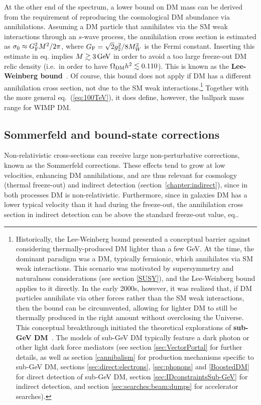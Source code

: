 At the other end of the spectrum, a lower bound on DM mass can be derived from the requirement of reproducing the cosmological DM abundance via annihilations. 
Assuming a DM particle that annihilates via the SM weak interactions through an $s$-wave process, 
the annihilation cross section is estimated as $\sigma_0 \approx G_{\rm F}^2 M^2/2\pi$, where $G_{\rm F} = \sqrt{2}g_2^2/8M^2_W$ is the Fermi constant. Inserting this estimate in eq. implies 
$M \gtrsim 3 \,{\rm GeV}$ in order to avoid a too large freeze-out DM relic density (i.e.~in order to have $\Omega_{\rm DM}h^2 \lesssim 0.110$). 
This is known as the {\bf Lee-Weinberg bound}~\cite{LeeWeinberg}. 
Of course, this bound does not apply if DM has a different annihilation cross section,
not due to the SM weak interactions.\footnote{
Historically, the Lee-Weinberg bound presented a conceptual barrier against considering thermally-produced DM lighter than a few GeV. 
At the time, the dominant paradigm was a DM, typically fermionic, which annihilates via SM weak interactions. This scenario was  
motivated by supersymmetry and naturalness considerations (see section \ref{SUSY}), and the Lee-Weinberg bound  applies to it directly.
 In the early 2000s, however,  it was realized that, if DM particles annihilate via other forces rather than the SM weak interactions, then the bound can be circumvented, allowing for lighter DM to still be thermally produced in the right amount without overclosing the Universe. 
This conceptual breakthrough initiated the theoretical explorations of {\bf sub-GeV DM}~\cite{sub-GeVDM}.  The models of sub-GeV DM typically feature a dark photon or other light dark force mediators (see section \ref{sec:VectorPortal} for further details, as well as section \ref{cannibalism} for production mechanisms specific to sub-GeV DM, 
sections \ref{sec:direct:electrons}, \ref{sec:phonons} and \ref{BoostedDM} for direct detection of sub-GeV DM, section \ref{sec:IDconstraintsSub-GeV} for indirect detection, and section \ref{sec:searches:beam:dumps} for accelerator searches).}
Together with the more general eq.~(\ref{eq:100TeV}), it does define, however, the ballpark mass range for WIMP DM. 


\subsection{Sommerfeld and bound-state corrections}
\label{Sommerfeld}
Non-relativistic cross-sections can receive large non-perturbative corrections, known as the Sommerfeld corrections.
These effects tend to grow at low velocities, enhancing DM annihilations, and are thus relevant for cosmology (thermal freeze-out) and
indirect detection (section~\ref{chapter:indirect}), since in both processes DM is non-relativistic. 
Furthermore, since in galaxies DM has a lower typical velocity than it had during the freeze-out, the annihilation cross section in indirect detection can be  
above the standard freeze-out value, eq..

